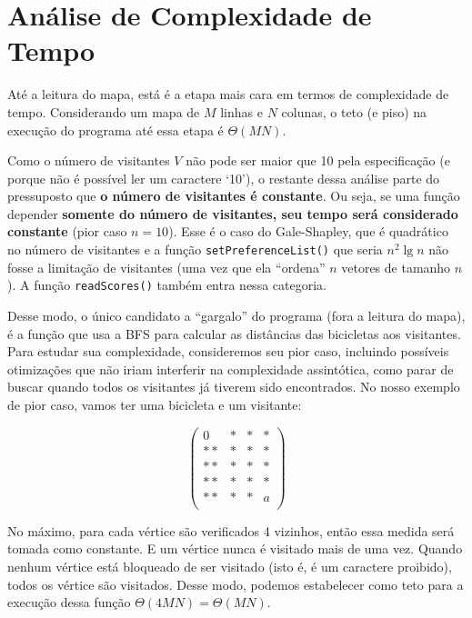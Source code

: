 \documentclass{article}
\def\code#1{\texttt{#1}}
\begin{document}
\section{Análise de Complexidade de Tempo}

Até a leitura do mapa, está é a etapa mais cara em termos de complexidade de tempo. Considerando um mapa de \( M \) linhas e \( N\) colunas, o teto (e piso) na execução do programa até essa etapa é \( \Theta(MN) \).

Como o número de visitantes \( V \) não pode ser maior que 10 pela especificação (e porque não é possível ler um caractere `10'), o restante dessa análise parte do pressuposto que \textbf{o número de visitantes é constante}. Ou seja, se uma função depender \textbf{somente do número de visitantes, seu tempo será considerado constante} (pior caso \( n = 10 \)). Esse é o caso do Gale-Shapley, que é quadrático no número de visitantes e a função \code{setPreferenceList()} que seria \( n^2 \lg n \) não fosse a limitação de visitantes (uma vez que ela ``ordena'' \( n \) vetores de tamanho \( n \)). A função \code{readScores()} também entra nessa categoria.

Desse modo, o único candidato a ``gargalo'' do programa (fora a leitura do mapa), é a função que usa a BFS para calcular as distâncias das bicicletas aos visitantes. Para estudar sua complexidade, consideremos seu pior caso, incluindo possíveis otimizações que não iriam interferir na complexidade assintótica, como parar de buscar quando todos os visitantes já tiverem sido encontrados. No nosso exemplo de pior caso, vamos ter uma bicicleta e um visitante:

\begin{equation}
	\left(\begin{array}{cccc}
		0  & * & * & * \\
		** & * & * & * \\
		** & * & * & * \\
		** & * & * & * \\
		** & * & * & a \\
	\end{array}\right)
\end{equation}

No máximo, para cada vértice são verificados 4 vizinhos, então essa medida será tomada como constante. E um vértice nunca é visitado mais de uma vez. Quando nenhum vértice está bloqueado de ser visitado (isto é, é um caractere proibido), todos os vértice são visitados. Desse modo, podemos estabelecer como teto para a execução dessa função \( \Theta(4MN) = \Theta(MN) \).
\end{document}
